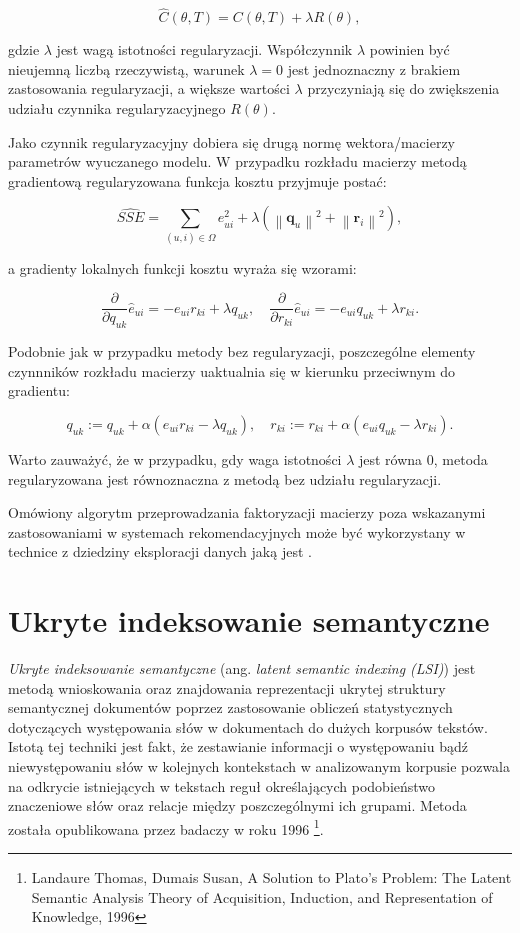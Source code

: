 \documentclass{pracamgr}
\newcommand{\norm}[1]{\left\lVert#1\right\rVert}
\begin{document}
\[
\hat{C}(\theta, T) = C(\theta, T) + \lambda R(\theta),
\]

gdzie $\lambda$ jest wagą istotności regularyzacji. Współczynnik $\lambda$ powinien być nieujemną liczbą rzeczywistą, warunek $\lambda = 0$ jest jednoznaczny z brakiem zastosowania regularyzacji, a większe wartości $\lambda$ przyczyniają się do zwiększenia udziału czynnika regularyzacyjnego $R(\theta)$.

Jako czynnik regularyzacyjny dobiera się drugą normę wektora/macierzy parametrów wyuczanego modelu. W przypadku rozkładu macierzy metodą gradientową regularyzowana funkcja kosztu przyjmuje postać:

\[
\hat{SSE} = \sum_{(u,i) \in \Omega} e_{ui}^2 + \lambda (\norm{\mathbf{q}_{u}}^2 + \norm{\mathbf{r}_{i}}^2),
\]

a gradienty lokalnych funkcji kosztu wyraża się wzorami:

\[
\frac{\partial}{\partial q_{uk}}\hat{e}_{ui} = -e_{ui} r_{ki} + \lambda q_{uk}, \quad
\frac{\partial}{\partial r_{ki}}\hat{e}_{ui} = -e_{ui} q_{uk} + \lambda r_{ki}.
\]

Podobnie jak w przypadku metody bez regularyzacji, poszczególne elementy czynnników rozkładu macierzy uaktualnia się w kierunku przeciwnym do gradientu:

\[
q_{uk} := q_{uk} + \alpha (e_{ui} r_{ki} - \lambda q_{uk}), \quad
r_{ki} := r_{ki} + \alpha (e_{ui} q_{uk} - \lambda r_{ki}).
\]

Warto zauważyć, że w przypadku, gdy waga istotności $\lambda$ jest równa 0, metoda regularyzowana jest równoznaczna z metodą bez udziału regularyzacji.

Omówiony algorytm przeprowadzania faktoryzacji macierzy poza wskazanymi zastosowaniami w systemach rekomendacyjnych może być wykorzystany w technice z dziedziny eksploracji danych jaką jest .

\section{Ukryte indeksowanie semantyczne}
\textit{Ukryte indeksowanie semantyczne} (ang. \textit{latent semantic indexing (LSI)}) jest metodą wnioskowania oraz znajdowania reprezentacji ukrytej struktury semantycznej dokumentów poprzez zastosowanie obliczeń statystycznych dotyczących występowania słów w dokumentach do dużych korpusów tekstów. Istotą tej techniki jest fakt, że zestawianie informacji o występowaniu bądź niewystępowaniu słów w kolejnych kontekstach w analizowanym korpusie pozwala na odkrycie istniejących w tekstach reguł określających podobieństwo znaczeniowe słów oraz relacje między poszczególnymi ich grupami. Metoda została opublikowana przez badaczy w roku 1996 \footnote{Landaure Thomas, Dumais Susan, A Solution to Plato's Problem: The Latent Semantic Analysis Theory
of Acquisition, Induction, and Representation of Knowledge, 1996}. 
\end{document}
